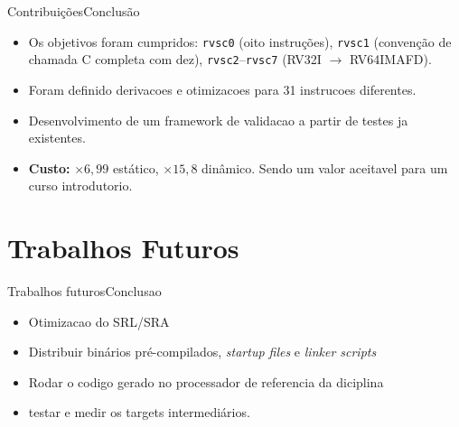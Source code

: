 \documentclass[aspectratio=169]{beamer} %
\begin{document}
\begin{frame}{Contribuições}{Conclusão}
    \small
    \begin{itemize}
        \item Os objetivos foram cumpridos: \texttt{rvsc0} (oito instruções),
              \texttt{rvsc1} (convenção de chamada C completa com dez),
              \texttt{rvsc2}--\texttt{rvsc7} (RV32I $\rightarrow$ RV64IMAFD).
        \item Foram definido derivacoes e otimizacoes para 31 instrucoes diferentes.
        \item Desenvolvimento de um framework de validacao a partir de testes ja existentes.
        \item \textbf{Custo:} $\times 6{,}99$ estático, $\times 15{,}8$ dinâmico.
              Sendo um valor aceitavel para um curso introdutorio.
        \end{itemize}
\end{frame}

\section{Trabalhos Futuros}

\begin{frame}{Trabalhos futuros}{Conclusao}
    \begin{itemize}
        \item Otimizacao do SRL/SRA
        \item Distribuir binários pré-compilados, \textit{startup files} e \textit{linker scripts}
        \item Rodar o codigo gerado no processador de referencia da diciplina
        \item testar e medir os targets intermediários.
    \end{itemize}
\end{frame}
\end{document}
